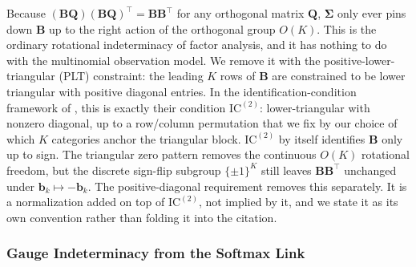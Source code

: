 Because $\left(\mathbf{B}\mathbf{Q}\right)\left(\mathbf{B}\mathbf{Q}\right)^{\top}=\mathbf{B}\mathbf{B}^{\top}$ for any orthogonal matrix $\mathbf{Q}$, $\bm{\Sigma}$ only ever pins down $\mathbf{B}$ up to the right action of the orthogonal group $O(K)$. This is the ordinary rotational indeterminacy of factor analysis, and it has nothing to do with the multinomial observation model. We remove it with the positive-lower-triangular (PLT) constraint: the leading $K$ rows of $\mathbf{B}$ are constrained to be lower triangular with positive diagonal entries. In the identification-condition framework of \citet{Cui2026}, this is exactly their condition $\mathrm{IC}^{(2)}$: lower-triangular with nonzero diagonal, up to a row/column permutation that we fix by our choice of which $K$ categories anchor the triangular block. $\mathrm{IC}^{(2)}$ by itself identifies $\mathbf{B}$ only up to sign. The triangular zero pattern removes the continuous $O(K)$ rotational freedom, but the discrete sign-flip subgroup $\{\pm1\}^K$ still leaves $\mathbf{B}\mathbf{B}^\top$ unchanged under $\mathbf{b}_k\mapsto-\mathbf{b}_k$. The positive-diagonal requirement removes this separately. It is a normalization added on top of $\mathrm{IC}^{(2)}$, not implied by it, and we state it as its own convention rather than folding it into the citation.

\subsubsection{Gauge Indeterminacy from the Softmax Link}
\label{subsubsec:gauge-indeterminacy}

